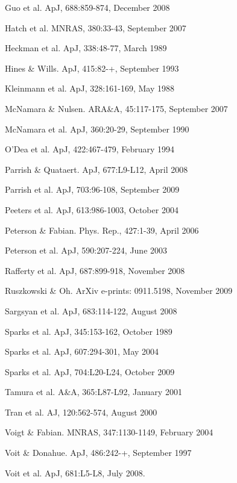 \documentclass[11pt]{article}
\begin{document}
\noindent [21] Guo et al. ApJ, 688:859-874, December 2008

\noindent [22] Hatch et al. MNRAS, 380:33-43, September 2007

\noindent [23] Heckman et al. ApJ, 338:48-77, March 1989

\noindent [24] Hines \& Wills. ApJ, 415:82-+, September 1993

\noindent [25] Kleinmann et al. ApJ, 328:161-169, May 1988

\noindent [26] McNamara \& Nulsen. ARA\&A, 45:117-175, September 2007

\noindent [27] McNamara et al. ApJ, 360:20-29, September 1990

\noindent [28] O'Dea et al. ApJ, 422:467-479, February 1994

\noindent [29] Parrish \& Quataert. ApJ, 677:L9-L12, April 2008

\noindent [30] Parrish et al. ApJ, 703:96-108, September 2009

\noindent [31] Peeters et al. ApJ, 613:986-1003, October 2004

\noindent [32] Peterson \& Fabian. Phys. Rep., 427:1-39, April 2006

\noindent [33] Peterson et al. ApJ, 590:207-224, June 2003

\noindent [34] Rafferty et al. ApJ, 687:899-918, November 2008

\noindent [35] Ruszkowski \& Oh. ArXiv e-prints: 0911.5198, November 2009

\noindent [36] Sargsyan et al. ApJ, 683:114-122, August 2008

\noindent [37] Sparks et al. ApJ, 345:153-162, October 1989

\noindent [38] Sparks et al. ApJ, 607:294-301, May 2004

\noindent [39] Sparks et al. ApJ, 704:L20-L24, October 2009

\noindent [40] Tamura et al. A\&A, 365:L87-L92, January 2001

\noindent [41] Tran et al. AJ, 120:562-574, August 2000

\noindent [42] Voigt \& Fabian. MNRAS, 347:1130-1149, February 2004

\noindent [43] Voit \& Donahue. ApJ, 486:242-+, September 1997

\noindent [44] Voit et al. ApJ, 681:L5-L8, July 2008.
\end{document}
